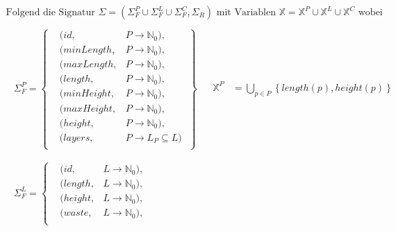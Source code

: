 \[
    \begin{aligned}
        \text{Folgend die Signatur } \Sigma = \left( \Sigma_{F}^{P} \cup \Sigma_{F}^{L} \cup \Sigma_{F}^{C}, \Sigma_{R} \right) \text{ mit Variablen } \mathbb{X} = \mathbb{X}^{P} \cup \mathbb{X}^{L} \cup \mathbb{X}^{C} \text{ wobei } \\[5pt]
            \begin{array}{ll}
                \begin{aligned}
                    \Sigma_{F}^{P} = \left\{
                    \begin{aligned}
                        & (id, & P \rightarrow \mathbb{N}_0), \\
                        & (minLength, & P \rightarrow \mathbb{N}_0), \\
                        & (maxLength, & P \rightarrow \mathbb{N}_0), \\
                        & (length, & P \rightarrow \mathbb{N}_0), \\
                        & (minHeight, & P \rightarrow \mathbb{N}_0), \\
                        & (maxHeight, & P \rightarrow \mathbb{N}_0), \\
                        & (height, & P \rightarrow \mathbb{N}_0), \\
                        & (layers, & P \rightarrow L_P \subseteq L)\; \\
                    \end{aligned} \right\} \\[5pt]
                \end{aligned}
                &
                \begin{aligned}
                    \mathbb{X}^{P} &= \bigcup_{p \in P} \left\{length(p), height(p) \right\} \\
                \end{aligned}
                \\
                \begin{aligned}
                    \Sigma_{F}^{L} = \left\{
                    \begin{aligned}
                        & (id, & L \rightarrow \mathbb{N}_0), \\
                        & (length, & L \rightarrow \mathbb{N}_0), \\
                        & (height, & L \rightarrow \mathbb{N}_0), \\
                        & (waste, & L \rightarrow \mathbb{N}_0), \\

\end{aligned}
\end{aligned}
\end{array}
\end{aligned}\]

